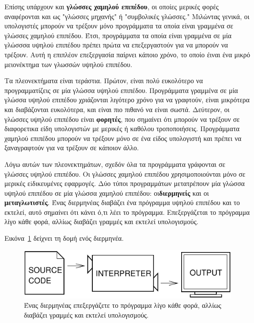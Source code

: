 \documentclass[10pt]{book}
\newcommand{\en}{\selectlanguage{english}}
\newcommand{\gr}{\selectlanguage{greek}}
\begin{document}
\gr Επίσης υπάρχουν και {\bf γλώσσες χαμηλού επιπέδου}, οι οποίες μερικές φορές
αναφέρονται και ως "γλώσσες μηχανής" ή "συμβολικές γλώσσες." Μιλώντας γενικά, οι
υπολογιστές μπορούν να τρέξουν μόνο προγράμματα τα οποία είναι γραμμένα σε γλώσσες
χαμηλού επιπέδου. Έτσι, προγράμματα τα οποία είναι γραμμένα σε μία γλώσσσα υψηλού
επιπέδου πρέπει πρώτα να επεξεργαστούν για να μπορούν να τρέξουν. Αυτή η επιπλέον
επεξεργασία παίρνει κάποιο χρόνο, το οποίο έιναι ένα μικρό μειονέκτημα των γλωσσών
υψηλού επιπέδου.


\gr Τα πλεονεκτήματα είναι τεράστια. Πρώτον, είναι πολύ ευκολότερο
να προγραμματίζεις σε μία γλώσσα υψηλού επιπέδου. Προγράμματα γραμμένα
σε μία γλώσσα υψηλού επιπέδου χριάζονται λιγότερο χρόνο για να γραφτούν,
είναι μικρότερα και διαβάζονται ευκολότερα, και είναι πιο πιθανό να είναι
σωστά. Δεύτερον, οι γλώσσες υψηλού επιπέδου είναι {\bf φορητές}, που σημαίνει
ότι μπορούν να τρέξουν σε διαφορετικα είδη υπολογιστών με μερικές ή καθόλου
τροποποιήσεις. Προγράμματα χαμηλού επιπέδου μπορούν να τρέξουν μόνο σε ένα είδος
υπολογιστή και πρέπει να ξαναγραφτούν για να τρέξουν σε κάποιον άλλο.

Λόγω αυτών των πλεονεκτημάτων, σχεδόν όλα τα προγράμματα γράφονται σε
γλώσσες υψηλού επιπέδου. Οι γλώσσες χαμηλού επιπέδου χρησιμοποιούνται μόνο
σε μερικές εiδικευμένες εφαρμογές.
\en
{}
\gr
Δύο τύποι προγραμμάτων μετατρέπουν μία γλώσσα υψηλού επιπέδου σε μία
γλώσσα χαμηλού επιπέδου: οι{\bf διερμηνείς} και οι {\bf μεταγλωτιστές}.
Ένας διερμηνέας διαβάζει ένα πρόγραμμα υψηλού επιπέδου και το εκτελεί,
αυτό σημαίνει ότι κάνει ό,τι λέει το πρόγραμμα. Επεξεργάζεται το πρόγραμμα
λίγο κάθε φορά, αλλίως διαβάζει γραμμές και εκτελεί υπολογισμούς.

Εικόνα~\ref{fig.interpret} δείχνει τη δομή ενός διερμηνέα.

\begin{figure}
\centerline
{\includegraphics[scale=0.9]{figs/interpret.pdf}}
\caption{Ένας διερμηνέας επεξεργάζετε το πρόγραμμα
λίγο κάθε φορά, αλλίως διαβάζει γραμμές και εκτελεί υπολογισμούς.}
\label{fig.interpret}
\end{figure}
\end{document}
